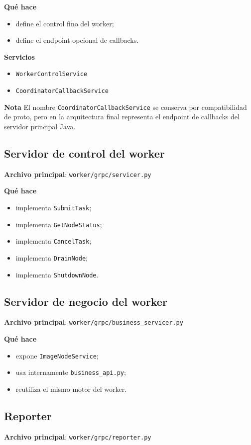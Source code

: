 \documentclass[11pt]{article}
\begin{document}
\textbf{Qué hace}
\begin{itemize}
\item define el control fino del worker;
\item define el endpoint opcional de callbacks.
\end{itemize}

\textbf{Servicios}
\begin{itemize}
\item \texttt{WorkerControlService}
\item \texttt{CoordinatorCallbackService}
\end{itemize}

\textbf{Nota}
El nombre \texttt{CoordinatorCallbackService} se conserva por compatibilidad de proto, pero en la arquitectura final representa el endpoint de callbacks del servidor principal Java.

\subsection{Servidor de control del worker}
\textbf{Archivo principal}: \texttt{worker/grpc/servicer.py}

\textbf{Qué hace}
\begin{itemize}
\item implementa \texttt{SubmitTask};
\item implementa \texttt{GetNodeStatus};
\item implementa \texttt{CancelTask};
\item implementa \texttt{DrainNode};
\item implementa \texttt{ShutdownNode}.
\end{itemize}

\subsection{Servidor de negocio del worker}
\textbf{Archivo principal}: \texttt{worker/grpc/business\_servicer.py}

\textbf{Qué hace}
\begin{itemize}
\item expone \texttt{ImageNodeService};
\item usa internamente \texttt{business\_api.py};
\item reutiliza el mismo motor del worker.
\end{itemize}

\subsection{Reporter}
\textbf{Archivo principal}: \texttt{worker/grpc/reporter.py}
\end{document}
